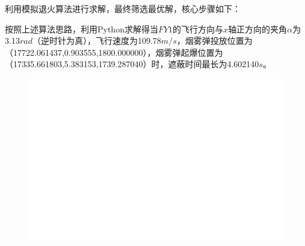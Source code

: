 \documentclass[../main.tex]{subfiles}
\begin{document}

利用模拟退火算法进行求解，最终筛选最优解，核心步骤如下：



按照上述算法思路，利用Python求解得当$FY1$的飞行方向与$x$轴正方向的夹角$\alpha$为3.13$rad$（逆时针为真），飞行速度为109.78$m/s$，烟雾弹投放位置为（17722.061437,0.903555,1800.000000），烟雾弹起爆位置为（17335.661803,5.383153,1739.287040）时，遮蔽时间最长为4.602140$s$。

\begin{figure}[H]
\centering
\includegraphics[scale=0.5]{标记图.png}
\caption{}
\label{图2}
\end{figure}
\end{document}

